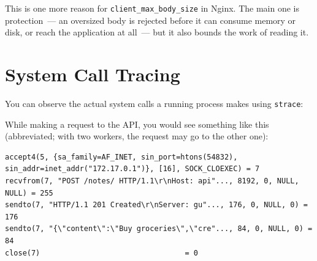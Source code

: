 \noindent{}This is one more reason for \texttt{client\_max\_body\_size} in Nginx. The main one is protection~--- an oversized body is rejected before it can consume memory or disk, or reach the application at all~--- but it also bounds the work of reading it.

\setcounter{section}{5}
\section{System Call Tracing}\label{30-kernel-application-handoff:306-system-call-tracing}

You can observe the actual system calls a running process makes using \texttt{strace}:

\begin{codebox}[short]

\begin{Shaded}
\begin{Highlighting}[]

\OperatorTok{\textgreater{}\&} \KeywordTok{|}  
\end{Highlighting}
\end{Shaded}

\end{codebox}

\noindent{}While making a request to the API, you would see something like this (abbreviated; with two workers, the request may go to the other one):

\begin{outputbox}[short]
\begin{Verbatim}[fontsize=\codesize, breaklines, breakanywhere, breaksymbolleft={\tiny\textcolor{muted}{$\hookrightarrow$}}]
accept4(5, {sa_family=AF_INET, sin_port=htons(54832), sin_addr=inet_addr("172.17.0.1")}, [16], SOCK_CLOEXEC) = 7
recvfrom(7, "POST /notes/ HTTP/1.1\r\nHost: api"..., 8192, 0, NULL, NULL) = 255
sendto(7, "HTTP/1.1 201 Created\r\nServer: gu"..., 176, 0, NULL, 0) = 176
sendto(7, "{\"content\":\"Buy groceries\",\"cre"..., 84, 0, NULL, 0) = 84
close(7)                                 = 0
\end{Verbatim}
\end{outputbox}

